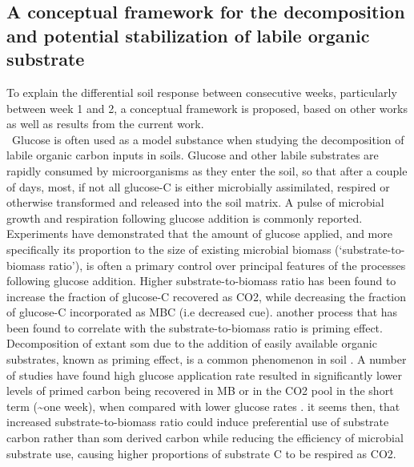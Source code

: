	\subsection{A conceptual framework for the decomposition and potential stabilization of labile organic substrate} \label{stabilizaton_model}
	To explain the differential soil response between consecutive weeks, particularly between week 1 and 2, a conceptual framework is proposed, based on other works as well as results from the current work.\\ \
		Glucose is often used as a model substance when studying the decomposition of labile organic carbon inputs in soils\citep{kuzyakov2010}. Glucose and other labile substrates are rapidly consumed by microorganisms as they enter the soil, so that after a couple of days, most, if not all glucose-C is either microbially assimilated, respired or otherwise transformed and released into the soil matrix\citep{fischer2010}. A pulse of microbial growth and respiration following glucose addition is commonly reported.
	Experiments have demonstrated that the amount of glucose applied, and more specifically its proportion to the size of existing microbial biomass (‘substrate-to-biomass ratio’), is often a primary control over principal features of the processes following  glucose addition. Higher substrate-to-biomass ratio has been found to increase the fraction of glucose-C recovered as CO2, while decreasing the fraction of glucose-C incorporated as MBC (i.e decreased \gls{cue})\citep{schneckenberger2008, tian2015}.
	another process that has been found to correlate with the substrate-to-biomass ratio is priming effect. Decomposition of extant \gls{som} due to the addition of easily available organic substrates, known as priming effect, is a common phenomenon in soil \citep{kuzyakov2010}. A number of studies have found  high glucose application rate resulted in significantly lower levels of primed carbon being recovered in MB or in the  CO2 pool in the short term (\~{}one week), when compared with lower glucose rates \citep{blagodatskaya2011, schneckenberger2008, wu1993}.
	it seems then, that increased substrate-to-biomass ratio could induce preferential use of substrate carbon rather than \gls{som} derived carbon while reducing the efficiency of microbial substrate use, causing higher proportions of substrate C to be respired as CO2.

